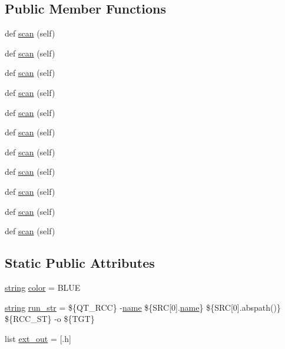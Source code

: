 \subsection*{Public Member Functions}
\begin{DoxyCompactItemize}
\item 
def \hyperlink{classwaflib_1_1_tools_1_1qt4_1_1rcc_a415ac4933f0d9f29fdc23cc0f487bd94}{scan} (self)
\item 
def \hyperlink{classwaflib_1_1_tools_1_1qt4_1_1rcc_a415ac4933f0d9f29fdc23cc0f487bd94}{scan} (self)
\item 
def \hyperlink{classwaflib_1_1_tools_1_1qt4_1_1rcc_a415ac4933f0d9f29fdc23cc0f487bd94}{scan} (self)
\item 
def \hyperlink{classwaflib_1_1_tools_1_1qt4_1_1rcc_a415ac4933f0d9f29fdc23cc0f487bd94}{scan} (self)
\item 
def \hyperlink{classwaflib_1_1_tools_1_1qt4_1_1rcc_a415ac4933f0d9f29fdc23cc0f487bd94}{scan} (self)
\item 
def \hyperlink{classwaflib_1_1_tools_1_1qt4_1_1rcc_a415ac4933f0d9f29fdc23cc0f487bd94}{scan} (self)
\item 
def \hyperlink{classwaflib_1_1_tools_1_1qt4_1_1rcc_a415ac4933f0d9f29fdc23cc0f487bd94}{scan} (self)
\item 
def \hyperlink{classwaflib_1_1_tools_1_1qt4_1_1rcc_a415ac4933f0d9f29fdc23cc0f487bd94}{scan} (self)
\item 
def \hyperlink{classwaflib_1_1_tools_1_1qt4_1_1rcc_a415ac4933f0d9f29fdc23cc0f487bd94}{scan} (self)
\item 
def \hyperlink{classwaflib_1_1_tools_1_1qt4_1_1rcc_a415ac4933f0d9f29fdc23cc0f487bd94}{scan} (self)
\item 
def \hyperlink{classwaflib_1_1_tools_1_1qt4_1_1rcc_a415ac4933f0d9f29fdc23cc0f487bd94}{scan} (self)
\end{DoxyCompactItemize}
\subsection*{Static Public Attributes}
\begin{DoxyCompactItemize}
\item 
\hyperlink{test__lib_f_l_a_c_2format_8c_ab02026ad0de9fb6c1b4233deb0a00c75}{string} \hyperlink{classwaflib_1_1_tools_1_1qt4_1_1rcc_ac4cac7ef9d1a957dad9114523c15a1f3}{color} = \textquotesingle{}B\+L\+UE\textquotesingle{}
\item 
\hyperlink{test__lib_f_l_a_c_2format_8c_ab02026ad0de9fb6c1b4233deb0a00c75}{string} \hyperlink{classwaflib_1_1_tools_1_1qt4_1_1rcc_ae61d8513177aee015292c3571d220c67}{run\+\_\+str} = \textquotesingle{}\$\{Q\+T\+\_\+\+R\+CC\} -\/\hyperlink{lib_2expat_8h_a1b49b495b59f9e73205b69ad1a2965b0}{name} \$\{S\+RC\mbox{[}0\mbox{]}.\hyperlink{lib_2expat_8h_a1b49b495b59f9e73205b69ad1a2965b0}{name}\} \$\{S\+RC\mbox{[}0\mbox{]}.abspath()\} \$\{R\+C\+C\+\_\+\+ST\} -\/o \$\{T\+GT\}\textquotesingle{}
\item 
list \hyperlink{classwaflib_1_1_tools_1_1qt4_1_1rcc_a5ca5ea98426c000892b63d886df2971d}{ext\+\_\+out} = \mbox{[}\textquotesingle{}.h\textquotesingle{}\mbox{]}
\end{DoxyCompactItemize}
